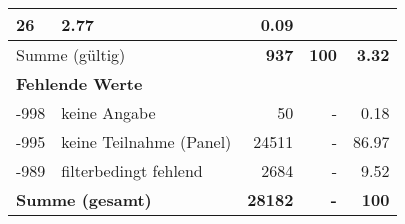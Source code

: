 \begin{longtable}{lXrrr}
       \num{26} &
       \num[round-mode=places,round-precision=2]{2.77} &
         \num[round-mode=places,round-precision=2]{0.09} \\
     \midrule
     \multicolumn{2}{l}{Summe (gültig)} &
       \textbf{\num{937}} &
     \textbf{100} &
       \textbf{\num[round-mode=places,round-precision=2]{3.32}} \\
     \multicolumn{5}{l}{\textbf{Fehlende Werte}}\\
       -998 &
       keine Angabe &
         \num{50} &
        - &
         \num[round-mode=places,round-precision=2]{0.18} \\
       -995 &
       keine Teilnahme (Panel) &
         \num{24511} &
        - &
         \num[round-mode=places,round-precision=2]{86.97} \\
       -989 &
       filterbedingt fehlend &
         \num{2684} &
        - &
         \num[round-mode=places,round-precision=2]{9.52} \\
     \midrule
     \multicolumn{2}{l}{\textbf{Summe (gesamt)}} &
          \textbf{\num{28182}} &
        \textbf{-} &
        \textbf{100} \\
     \bottomrule
     \end{longtable}
     
